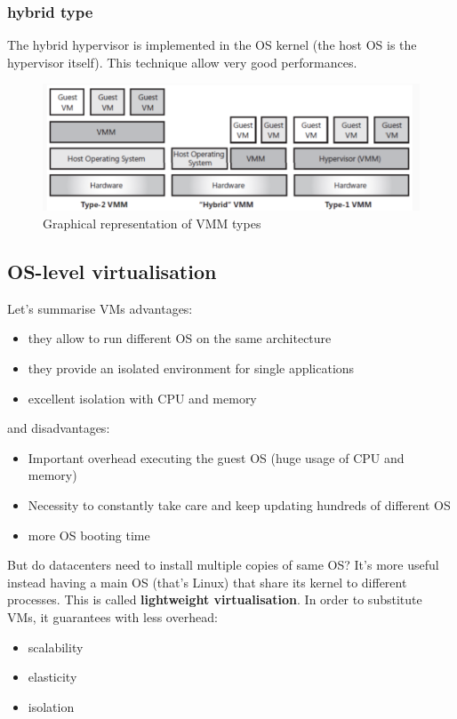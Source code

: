 \subsubsection{hybrid type}
The hybrid hypervisor is implemented in the OS kernel (the host OS is the hypervisor itself). This technique allow very good performances.

\begin{figure}[h!]
    \centering
    \includegraphics[scale=0.4]{images/VMM architectures.png}
    \caption{Graphical representation of VMM types}
\end{figure}


\subsection{OS-level virtualisation}
Let's summarise VMs advantages:
\begin{itemize}
    \item they allow to run different OS on the same architecture
    \item they provide an isolated environment for single applications 
    \item excellent isolation with CPU and memory
\end{itemize}
and disadvantages:
\begin{itemize}
    \item Important overhead executing the guest OS (huge usage of CPU and memory)
    \item Necessity to constantly take care and keep updating hundreds of different OS
    \item more OS booting time
\end{itemize}

But do datacenters need to install multiple copies of same OS? It's more useful instead having a main OS (that's Linux) that share its kernel to different processes.
This is called \textbf{lightweight virtualisation}. In order to substitute VMs, it guarantees with less overhead:
\begin{itemize}
    \item scalability
    \item elasticity
    \item isolation
\end{itemize}

